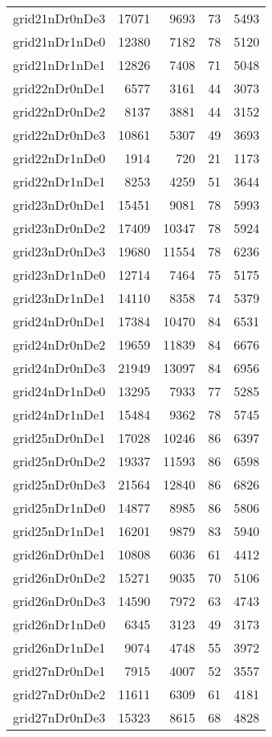 \begin{longtable}{lrrrr}
grid21nDr0nDe3 & 17071 & 9693 & 73 & 5493 \\
grid21nDr1nDe0 & 12380 & 7182 & 78 & 5120 \\
grid21nDr1nDe1 & 12826 & 7408 & 71 & 5048 \\
grid22nDr0nDe1 & 6577 & 3161 & 44 & 3073 \\
grid22nDr0nDe2 & 8137 & 3881 & 44 & 3152 \\
grid22nDr0nDe3 & 10861 & 5307 & 49 & 3693 \\
grid22nDr1nDe0 & 1914 & 720 & 21 & 1173 \\
grid22nDr1nDe1 & 8253 & 4259 & 51 & 3644 \\
grid23nDr0nDe1 & 15451 & 9081 & 78 & 5993 \\
grid23nDr0nDe2 & 17409 & 10347 & 78 & 5924 \\
grid23nDr0nDe3 & 19680 & 11554 & 78 & 6236 \\
grid23nDr1nDe0 & 12714 & 7464 & 75 & 5175 \\
grid23nDr1nDe1 & 14110 & 8358 & 74 & 5379 \\
grid24nDr0nDe1 & 17384 & 10470 & 84 & 6531 \\
grid24nDr0nDe2 & 19659 & 11839 & 84 & 6676 \\
grid24nDr0nDe3 & 21949 & 13097 & 84 & 6956 \\
grid24nDr1nDe0 & 13295 & 7933 & 77 & 5285 \\
grid24nDr1nDe1 & 15484 & 9362 & 78 & 5745 \\
grid25nDr0nDe1 & 17028 & 10246 & 86 & 6397 \\
grid25nDr0nDe2 & 19337 & 11593 & 86 & 6598 \\
grid25nDr0nDe3 & 21564 & 12840 & 86 & 6826 \\
grid25nDr1nDe0 & 14877 & 8985 & 86 & 5806 \\
grid25nDr1nDe1 & 16201 & 9879 & 83 & 5940 \\
grid26nDr0nDe1 & 10808 & 6036 & 61 & 4412 \\
grid26nDr0nDe2 & 15271 & 9035 & 70 & 5106 \\
grid26nDr0nDe3 & 14590 & 7972 & 63 & 4743 \\
grid26nDr1nDe0 & 6345 & 3123 & 49 & 3173 \\
grid26nDr1nDe1 & 9074 & 4748 & 55 & 3972 \\
grid27nDr0nDe1 & 7915 & 4007 & 52 & 3557 \\
grid27nDr0nDe2 & 11611 & 6309 & 61 & 4181 \\
grid27nDr0nDe3 & 15323 & 8615 & 68 & 4828 \\

\end{longtable}
